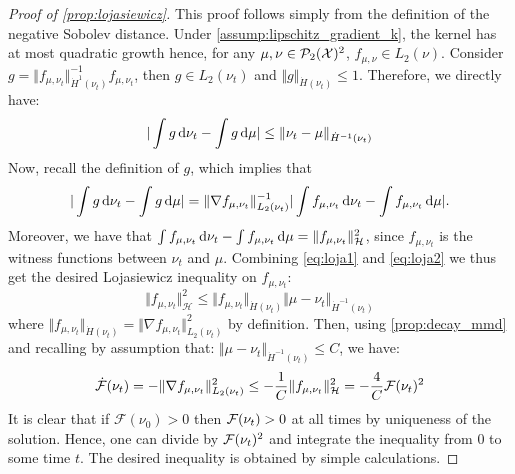 \begin{proof}[Proof of \cref{prop:lojasiewicz}]\label{proof:prop:lojasiewicz}
	This proof follows simply from the definition of the negative Sobolev distance. Under \cref{assump:lipschitz_gradient_k}, the kernel has at most quadratic growth hence, for any $\mu,\nu \in \mathcal{P}_2({{\mathcal X}})^2$, $f_{\mu,\nu}\in L_2(\nu)$. Consider $g = \Vert f_{\mu, \nu_t}\Vert^{-1}_{\dot{H}^1(\nu_t)} f_{\mu, \nu_t}$, then $g\in L_2(\nu_t)$ and $\Vert g \Vert_{\dot{H}(\nu_t)}\leq 1$. Therefore, we directly have:
	\begin{align}\label{eq:loja1}
	\vert \int g \mathop{}\!\mathrm{d} \nu_t - \int g \mathop{}\!\mathrm{d} \mu  \vert \leq \Vert \nu_t - \mu\Vert_{\dot{H}^{-1}(\nu_t)} 
	\end{align}
	Now, recall the definition of $g$, which implies that
	\begin{equation}\label{eq:loja2}
	\vert \int g \mathop{}\!\mathrm{d} \nu_t - \int g \mathop{}\!\mathrm{d} \mu  \vert = \Vert \nabla f_{\mu, \nu_t}\Vert^{-1}_{L_2(\nu_t)} \vert \int f_{\mu, \nu_t}\mathop{}\!\mathrm{d} \nu_t-\int f_{\mu, \nu_t} \mathop{}\!\mathrm{d} \mu \vert.
	\end{equation}
	Moreover,  we have that $\int f_{\mu, \nu_t}\mathop{}\!\mathrm{d} \nu_t-\int f_{\mu,\nu_t}\mathop{}\!\mathrm{d} \mu = \Vert f_{\mu, \nu_t}\Vert^2_{{{\mathcal H}}}$, since $f_{\mu, \nu_t}$  is the witness functions between $\nu_t$ and $\mu$. Combining \eqref{eq:loja1} and \eqref{eq:loja2} we thus get the desired Lojasiewicz inequality on $f_{\mu,\nu_t}$:
	\begin{equation}
	\Vert f_{\mu,\nu_t} \Vert^2_{\mathcal{H}} \leq \Vert f_{\mu,\nu_t} \Vert_{\dot{H}(\nu_t)} \Vert  \mu -\nu_t\Vert_{\dot{H}^{-1}(\nu_t)}  
	\end{equation}
	where $\Vert f_{\mu,\nu_t} \Vert_{\dot{H}(\nu_t)}=\Vert \nabla f_{\mu, \nu_t} \Vert^2_{L_2(\nu_t)}$ by definition. Then, 
	using \cref{prop:decay_mmd} and recalling by assumption that: $\Vert \mu - \nu_t \Vert_{\dot{H}^{-1}(\nu_t)} \le C$, we have:  
	\begin{align}\label{eq:PL_inequality}
	\dot{{{\mathcal F}}}(\nu_t) = - \Vert \nabla f_{\mu, \nu_t} \Vert^2_{L_2(\nu_t)} \leq -\frac{1}{C}\Vert f_{\mu,\nu_t} \Vert^2_{\mathcal{H}}= -\frac{4}{C}{{\mathcal F}}(\nu_t)^2	
	\end{align}
	It is clear that if $\mathcal{F}(\nu_0)>0$ then ${{\mathcal F}}(\nu_t)>0$ at all times by uniqueness of the solution. Hence, one can divide by ${{\mathcal F}}(\nu_t)^2$ and integrate the inequality from $0$ to some time $t$. The desired inequality is obtained by simple calculations.
\end{proof}

